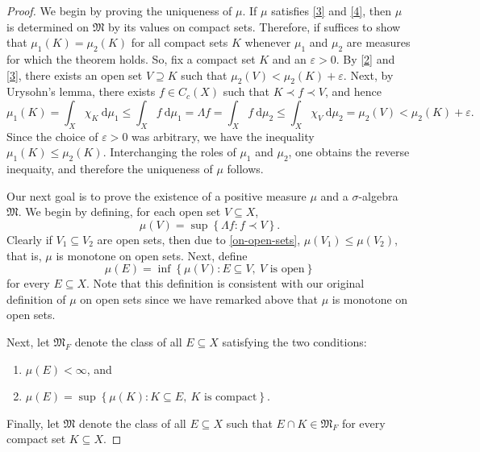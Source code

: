 \documentclass[11pt]{article}
\theoremstyle{thmstyle}
\theoremstyle{defstyle}
\newcommand{\frakM}{\mathfrak{M}} %
\renewcommand{\le}{\leqslant}
\begin{document}
\begin{proof}
    We begin by proving the uniqueness of $\mu$. If $\mu$ satisfies \ref{3} and \ref{4}, then $\mu$ is determined on $\frakM$ by its values on compact sets. Therefore, if suffices to show that $\mu_1(K) = \mu_2(K)$ for all compact sets $K$ whenever $\mu_1$ and $\mu_2$ are measures for which the theorem holds. So, fix a compact set $K$ and an $\varepsilon > 0$. By \ref{2} and \ref{3}, there exists an open set $V\supseteq K$ such that $\mu_2(V) < \mu_2(K) + \varepsilon$. Next, by Urysohn's lemma, there exists $f\in C_c(X)$ such that $K\prec f\prec V$, and hence 
    \begin{equation*}
        \mu_1(K) = \int_X\chi_K~\mathrm d\mu_1\le\int_X f~\mathrm d\mu_1 = \Lambda f = \int_X f~\mathrm d\mu_2\le\int_X\chi_V~\mathrm d\mu_2 = \mu_2(V) < \mu_2(K) + \varepsilon.
    \end{equation*}
    Since the choice of $\varepsilon > 0$ was arbitrary, we have the inequality $\mu_1(K)\le \mu_2(K)$. Interchanging the roles of $\mu_1$ and $\mu_2$, one obtains the reverse inequaity, and therefore the uniqueness of $\mu$ follows.

    Our next goal is to prove the existence of a positive measure $\mu$ and a $\sigma$-algebra $\frakM$. We begin by defining, for each open set $V\subseteq X$, 
    \begin{equation}\label{on-open-sets}\tag{$\star$}
        \mu(V) = \sup\left\{\Lambda f\colon f\prec V\right\}.
    \end{equation}
    Clearly if $V_1\subseteq V_2$ are open sets, then due to \eqref{on-open-sets}, $\mu(V_1)\le\mu(V_2)$, that is, $\mu$ is monotone on open sets. Next, define 
    \begin{equation*}
        \mu(E) = \inf\left\{\mu(V)\colon E\subseteq V,~V\text{ is open}\right\}
    \end{equation*}
    for every $E\subseteq X$. Note that this definition is consistent with our original definition of $\mu$ on open sets since we have remarked above that $\mu$ is monotone on open sets.

    Next, let $\frakM_F$ denote the class of all $E\subseteq X$ satisfying the two conditions: 
    \begin{enumerate}[label=(\roman*)]
        \item $\mu(E) < \infty$, and 
        \item $\mu(E) = \sup\left\{\mu(K)\colon K\subseteq E,~K\text{ is compact}\right\}$.
    \end{enumerate}
    Finally, let $\frakM$ denote the class of all $E\subseteq X$ such that $E\cap K\in\frakM_F$ for every compact set $K\subseteq X$.


\end{proof}
\end{document}
